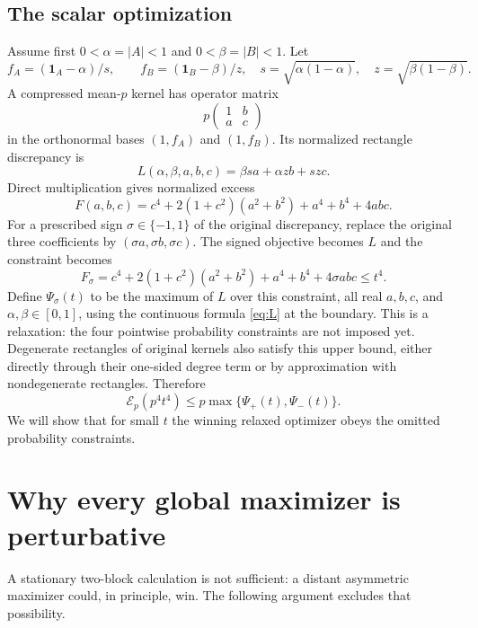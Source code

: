 \documentclass[11pt]{article}
\theoremstyle{definition}
\newcommand{\1}{\mathbf 1}
\newcommand{\calE}{\mathcal E}
\begin{document}
\subsection{The scalar optimization}
Assume first $0<\alpha=|A|<1$ and $0<\beta=|B|<1$. Let
\[
 f_A=(\1_A-\alpha)/s,\qquad f_B=(\1_B-\beta)/z,
 \quad s=\sqrt{\alpha(1-\alpha)},\quad z=\sqrt{\beta(1-\beta)}.
\]
A compressed mean-$p$ kernel has operator matrix
\[
 p\begin{pmatrix}1&b\\a&c\end{pmatrix}
\]
in the orthonormal bases $(1,f_A)$ and $(1,f_B)$. Its normalized rectangle discrepancy is
\begin{equation}\label{eq:L}
 L(\alpha,\beta,a,b,c)=\beta s a+\alpha z b+szc.
\end{equation}
Direct multiplication gives normalized excess
\begin{equation}\label{eq:F}
 F(a,b,c)=c^4+2(1+c^2)(a^2+b^2)+a^4+b^4+4abc.
\end{equation}
For a prescribed sign $\sigma\in\{-1,1\}$ of the original discrepancy, replace the original three coefficients by $(\sigma a,\sigma b,\sigma c)$. The signed objective becomes $L$ and the constraint becomes
\begin{equation}\label{eq:Fsigma}
 F_\sigma=c^4+2(1+c^2)(a^2+b^2)+a^4+b^4+4\sigma abc\le t^4.
\end{equation}
Define $\Psi_\sigma(t)$ to be the maximum of $L$ over this constraint, all real $a,b,c$, and $\alpha,\beta\in[0,1]$, using the continuous formula \eqref{eq:L} at the boundary. This is a relaxation: the four pointwise probability constraints are not imposed yet. Degenerate rectangles of original kernels also satisfy this upper bound, either directly through their one-sided degree term or by approximation with nondegenerate rectangles. Therefore
\begin{equation}\label{eq:relaxedupper}
 \calE_p(p^4t^4)\le p\max\{\Psi_+(t),\Psi_-(t)\}.
\end{equation}
We will show that for small $t$ the winning relaxed optimizer obeys the omitted probability constraints.

\section{Why every global maximizer is perturbative}\label{sec:localize}
A stationary two-block calculation is not sufficient: a distant asymmetric maximizer could, in principle, win. The following argument excludes that possibility.
\end{document}
